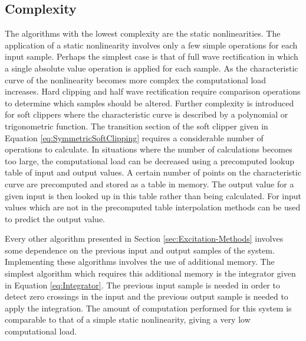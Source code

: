 	\subsection{Complexity}
	\label{sec:ExcitationEvaluation-Comparison-Complexity}
		The algorithms with the lowest complexity are the static nonlinearities. The application of a static
		nonlinearity involves only a few simple operations for each input sample. Perhaps the simplest case is that
		of full wave rectification in which a single absolute value operation is applied for each sample. As the
		characteristic curve of the nonlinearity becomes more complex the computational load increases. Hard
		clipping and half wave rectification require comparison operations to determine which samples should be
		altered. Further complexity is introduced for soft clippers where the characteristic curve is described by
		a polynomial or trigonometric function. The transition section of the soft clipper given in Equation
		\ref{eq:SymmetricSoftClipping} requires a considerable number of operations to calculate. In situations
		where the number of calculations becomes too large, the computational load can be decreased using a
		precomputed lookup table of input and output values. A certain number of points on the characteristic curve
		are precomputed and stored as a table in memory. The output value for a given input is then looked up in
		this table rather than being calculated. For input values which are not in the precomputed table
		interpolation methods can be used to predict the output value.

		Every other algorithm presented in Section \ref{sec:Excitation-Methods} involves some dependence on the
		previous input and output samples of the system. Implementing these algorithms involves the use of
		additional memory. The simplest algorithm which requires this additional memory is the integrator given in
		Equation \ref{eq:Integrator}. The previous input sample is needed in order to detect zero crossings in the
		input and the previous output sample is needed to apply the integration. The amount of computation
		performed for this system is comparable to that of a simple static nonlinearity, giving a very low
		computational load.

